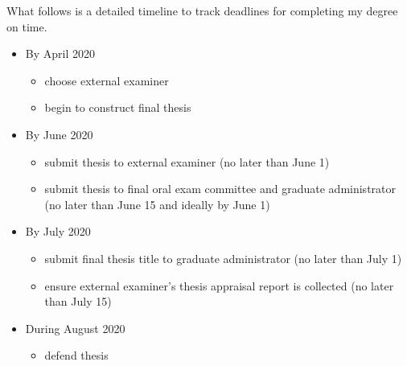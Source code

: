 \documentclass[11pt]{article}
\begin{document}
What follows is a detailed timeline to track deadlines for completing my degree on time.
\begin{itemize}
\item By April 2020
\begin{itemize}
	\item choose external examiner
	\item begin to construct final thesis
\end{itemize}
\item By June 2020
\begin{itemize}
	\item submit thesis to external examiner (no later than June 1)
	\item submit thesis to final oral exam committee and graduate administrator (no later than June 15 and ideally by June 1)
\end{itemize}
\item By July 2020
\begin{itemize}
\item submit final thesis title to graduate administrator (no later than July 1)
\item ensure external examiner's thesis appraisal report is collected (no later than July 15)
\end{itemize}
\item During August 2020
\begin{itemize}
\item defend thesis
\end{itemize}
\end{itemize}
\end{document}
